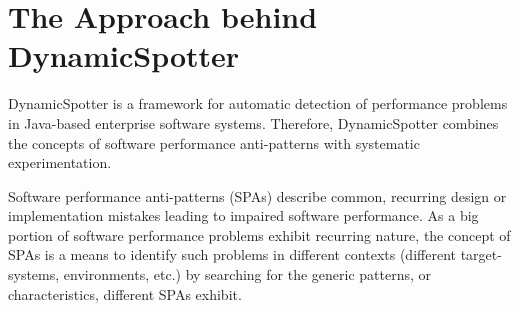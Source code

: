 \documentclass{report}
\newcommand{\DS}{DynamicSpotter }
\begin{document}
% 
% 
% 
\tableofcontents

\newpage
\section{The Approach behind \DS}
\label{sec:approach}
\DS is a framework for automatic detection of performance problems in Java-based enterprise software systems. Therefore,
\DS combines the concepts of software performance anti-patterns with systematic experimentation. 

Software performance
anti-patterns (SPAs) \cite{smith2000software,smith2002software,smith2003more,smith2003new} describe common, recurring
design or implementation mistakes leading to impaired software performance. As a big portion of software performance
problems exhibit recurring nature, the concept of SPAs is a means to identify such problems in different
contexts (different target-systems, environments, etc.) by searching for the generic patterns, or characteristics,
different SPAs exhibit. 
\end{document}
